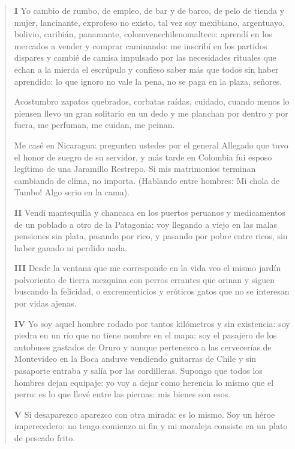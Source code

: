 \documentclass[12pt]{article}
\begin{document}
\clearpage
{}
\begin{verse}
\vspace{\baselineskip}
{\scshape\bfseries I}
Yo cambio de rumbo, de empleo, de bar y de barco, de pelo  
de tienda y mujer, lancinante, exprofeso no existo,  
tal vez soy mexibiano, argentuayo, bolivio,  
caribián, panamante, colomvenechilenomalteco:  
aprendí en los mercados a vender y comprar caminando:  
me inscribí en los partidos dispares y cambié de camisa impulsado  
por las necesidades rituales que echan a la mierda el escrúpulo  
y confieso saber más que todos sin haber aprendido:  
lo que ignoro no vale la pena, no se paga en la plaza, señores.  

Acostumbro zapatos quebrados, corbatas raídas, cuidado,  
cuando menos lo piensen llevo un gran solitario en un dedo  
y me planchan por dentro y por fuera, me perfuman, me cuidan, me  
peinan.  

Me casé en Nicaragua: pregunten ustedes por el general Allegado  
que tuvo el honor de suegro de su servidor, y más tarde  
en Colombia fui esposo legítimo de una Jaramillo Restrepo.  
Si mis matrimonios terminan cambiando de clima, no importa.  
(Hablando entre hombres: Mi chola de Tambo! Algo serio en la cama).  

\vspace{\baselineskip}
{\scshape\bfseries II}
Vendí mantequilla y chancaca en los puertos peruanos  
y medicamentos de un poblado a otro de la Patagonia:  
voy llegando a viejo en las malas pensiones sin plata, pasando por rico,  
y pasando por pobre entre ricos, sin haber ganado ni perdido nada.  

\vspace{\baselineskip}
{\scshape\bfseries III}
Desde la ventana que me corresponde en la vida  
veo el mismo jardín polvoriento de tierra mezquina  
con perros errantes que orinan y siguen buscando la felicidad,  
o excrementicios y eróticos gatos que no se interesan por vidas ajenas.  

\vspace{\baselineskip}
{\scshape\bfseries IV}
Yo soy aquel hombre rodado por tantos kilómetros y sin existencia:  
soy piedra en un río que no tiene nombre en el mapa:  
soy el pasajero de los autobuses gastados de Oruro  
y aunque pertenezco a las cervecerías de Montevideo  
en la Boca anduve vendiendo guitarras de Chile  
y sin pasaporte entraba y salía por las cordilleras.  
Supongo que todos los hombres dejan equipaje:  
yo voy a dejar como herencia lo mismo que el perro:  
es lo que llevé entre las piernas: mis bienes son esos.  

\vspace{\baselineskip}
{\scshape\bfseries V}
Si desaparezco aparezco con otra mirada: es lo mismo.  
Soy un héroe imperecedero: no tengo comienzo ni fin  
y mi moraleja consiste en un plato de pescado frito.  
\end{verse}
\end{document}
